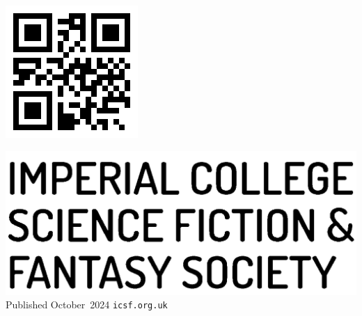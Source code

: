 \begin{minipage}{\textwidth}
\begin{minipage}[h]{7.8em}
\includegraphics[height=\textwidth]{img/info/qr-small.png}
\end{minipage}%
\hspace{1.5em}%
\begin{minipage}[h]{12em}
\raggedright
\includegraphics[width=\textwidth]{img/logo/logo-text.png}
Published October~2024
\texttt{icsf.org.uk}
\end{minipage}
\hspace*{\fill}%
\end{minipage}
